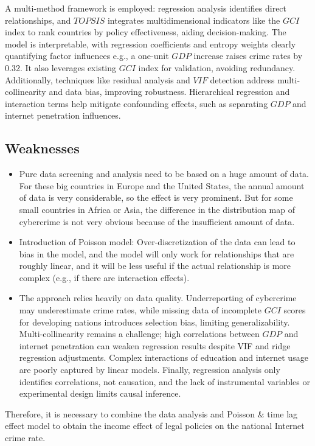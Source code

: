 \begin{itemize}
            A multi-method framework is employed: regression analysis identifies direct relationships, and
            $TOPSIS$ integrates multidimensional indicators like the $GCI$ index to rank countries by policy effectiveness, aiding decision-making.
            The model is interpretable, with regression coefficients and entropy weights clearly quantifying factor influences e.g.,
            a one-unit $GDP$ increase raises crime rates by 0.32.
            It also leverages existing $GCI$ index for validation, avoiding redundancy.
            Additionally, techniques like residual analysis and $VIF$ detection address multi-collinearity and data bias, improving robustness.
            Hierarchical regression and interaction terms help mitigate confounding effects,
            such as separating $GDP$ and internet penetration influences.
    \end{itemize}

\subsection{Weaknesses}\label{subsec:weaknesses} %
    \begin{itemize}
        \item Pure data screening and analysis need to be based on a huge amount of data.
            For these big countries in Europe and the United States, the annual amount of data is very considerable,
            so the effect is very prominent.
            But for some small countries in Africa or Asia,
            the difference in the distribution map of cybercrime is not very obvious because of the insufficient amount of data.
        \item Introduction of Poisson model: Over-discretization of the data can lead to bias in the model,
            and the model will only work for relationships that are roughly linear,
            and it will be less useful if the actual relationship is more complex (e.g., if there are interaction effects).
        \item The approach relies heavily on data quality.
            Underreporting of cybercrime may underestimate crime rates,
            while missing data of incomplete $GCI$ scores for developing nations introduces selection bias, limiting generalizability.
            Multi-collinearity remains a challenge; high correlations between $GDP$ and internet penetration can weaken regression results despite VIF and ridge regression adjustments.
            Complex interactions of education and internet usage are poorly captured by linear models.
            Finally, regression analysis only identifies correlations, not causation,
            and the lack of instrumental variables or experimental design limits causal inference.
    \end{itemize}

    Therefore, it is necessary to combine the data analysis and Poisson \& time lag effect model
    to obtain the income effect of legal policies on the national Internet crime rate.

